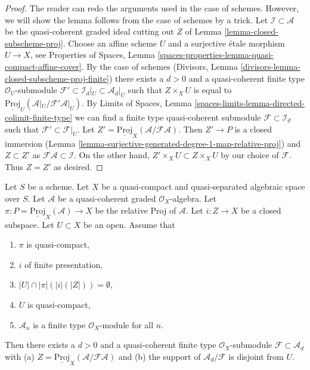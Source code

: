 \begin{proof}
The reader can redo the arguments used in the case of schemes. However, we
will show the lemma follows from the case of schemes by a trick.
Let $\mathcal{I} \subset \mathcal{A}$ be the quasi-coherent graded
ideal cutting out $Z$ of Lemma \ref{lemma-closed-subscheme-proj}.
Choose an affine scheme $U$ and a surjective \'etale morphism
$U \to X$, see Properties of Spaces, Lemma
\ref{spaces-properties-lemma-quasi-compact-affine-cover}.
By the case of schemes
(Divisors, Lemma \ref{divisors-lemma-closed-subscheme-proj-finite})
there exists a $d > 0$ and a quasi-coherent finite type
$\mathcal{O}_U$-submodule
$\mathcal{F}' \subset \mathcal{I}_d|_U \subset \mathcal{A}_d|_U$
such that $Z \times_X U$ is equal to
$\underline{\text{Proj}}_U(\mathcal{A}|_U/\mathcal{F}'\mathcal{A}|_U)$.
By Limits of Spaces, Lemma
\ref{spaces-limits-lemma-directed-colimit-finite-type}
we can find a finite type quasi-coherent submodule
$\mathcal{F} \subset \mathcal{I}_d$ such that
$\mathcal{F}' \subset \mathcal{F}|_U$. Let
$Z' = \underline{\text{Proj}}_X(\mathcal{A}/\mathcal{F}\mathcal{A})$.
Then $Z' \to P$ is a closed immersion
(Lemma \ref{lemma-surjective-generated-degree-1-map-relative-proj})
and $Z \subset Z'$ as $\mathcal{F}\mathcal{A} \subset \mathcal{I}$.
On the other hand, $Z' \times_X U \subset Z \times_X U$ by our
choice of $\mathcal{F}$. Thus $Z = Z'$ as desired.
\end{proof}

\begin{lemma}
\label{lemma-closed-subscheme-proj-finite-type}
Let $S$ be a scheme. Let $X$ be a quasi-compact and quasi-separated
algebraic space over $S$.
Let $\mathcal{A}$ be a quasi-coherent graded $\mathcal{O}_X$-algebra.
Let $\pi : P = \underline{\text{Proj}}_X(\mathcal{A}) \to X$ be the relative
Proj of $\mathcal{A}$. Let $i : Z \to X$ be a closed subspace.
Let $U \subset X$ be an open. Assume that
\begin{enumerate}
\item $\pi$ is quasi-compact,
\item $i$ of finite presentation,
\item $|U| \cap |\pi|(|i|(|Z|)) = \emptyset$,
\item $U$ is quasi-compact,
\item $\mathcal{A}_n$ is a finite type $\mathcal{O}_X$-module for all $n$.
\end{enumerate}
Then there exists a $d > 0$ and a quasi-coherent finite type
$\mathcal{O}_X$-submodule $\mathcal{F} \subset \mathcal{A}_d$ with (a)
$Z = \underline{\text{Proj}}_X(\mathcal{A}/\mathcal{F}\mathcal{A})$
and (b) the support of $\mathcal{A}_d/\mathcal{F}$ is disjoint from $U$.
\end{lemma}

